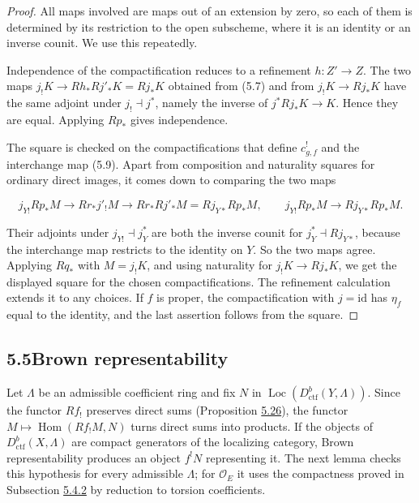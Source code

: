 \documentclass[11pt]{article}
\providecommand{\Hom}{}\renewcommand{\Hom}{\operatorname{Hom}}
\providecommand{\Loc}{}\renewcommand{\Loc}{\operatorname{Loc}}
\begin{document}
\begin{proof}[{Proof}]\label{bp500}%
All maps involved are maps out of an extension by zero, so each of them is determined by its restriction to the open subscheme, where it is an identity or an inverse counit. We use this repeatedly.

Independence of the compactification reduces to a refinement \(h:Z'\to Z\). The two maps \(j_!K\to Rh_*Rj'_*K=Rj_*K\) obtained from (5.7) and from \(j_!K\to Rj_*K\) have the same adjoint under \(j_!\dashv j^*\), namely the inverse of \(j^*Rj_*K\to K\). Hence they are equal. Applying \(Rp_*\) gives independence.

The square is checked on the compactifications that define \(c^!_{g,f}\) and the interchange map (5.9). Apart from composition and naturality squares for ordinary direct images, it comes down to comparing the two maps

\[
j_{Y!}Rp_*M\longrightarrow Rr_*j'_!M
\longrightarrow Rr_*Rj'_*M=Rj_{Y*}Rp_*M,
\qquad
j_{Y!}Rp_*M\longrightarrow Rj_{Y*}Rp_*M.
\]

Their adjoints under \(j_{Y!}\dashv j_Y^*\) are both the inverse counit for \(j_Y^*\dashv Rj_{Y*}\), because the interchange map restricts to the identity on \(Y\). So the two maps agree. Applying \(Rq_*\) with \(M=j_!K\), and using naturality for \(j_!K\to Rj_*K\), we get the displayed square for the chosen compactifications. The refinement calculation extends it to any choices. If \(f\) is proper, the compactification with \(j=\mathrm{id}\) has \(\eta_f\) equal to the identity, and the last assertion follows from the square.
\end{proof}



\subsection*{\texorpdfstring{5.5\quad Brown representability}{5.5 Brown representability}}
\label{bp501}%
\label{bp502}%
Let \(\Lambda\) be an admissible coefficient ring and fix \(N\) in \(\Loc(D^b_{\mathrm{ctf}}(Y,\Lambda))\). Since the functor \(Rf_!\) preserves direct sums (Proposition \hyperref[bp492]{5.26}), the functor \(M\mapsto\Hom(Rf_!M,N)\) turns direct sums into products. If the objects of \(D^b_{\mathrm{ctf}}(X,\Lambda)\) are compact generators of the localizing category, Brown representability produces an object \(f^!N\) representing it. The next lemma checks this hypothesis for every admissible \(\Lambda\); for \(\mathcal O_E\) it uses the compactness proved in Subsection \hyperref[bp469]{5.4.2} by reduction to torsion coefficients.
\end{document}
